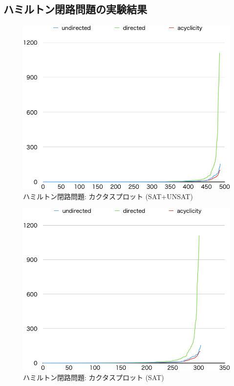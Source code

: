 \subsection{ハミルトン閉路問題の実験結果}


\begin{figure}[tb]
\begin{center}
  \includegraphics[width=0.6\linewidth]{fig/cactus.png}
\caption{ハミルトン閉路問題: カクタスプロット (\textsf{SAT+UNSAT})}
\label{cactus}
\end{center}
\end{figure}

\begin{figure}[tb]
\begin{center}
  \includegraphics[width=0.6\linewidth]{fig/cactussat.png}
\caption{ハミルトン閉路問題: カクタスプロット (\textsf{SAT})}
\label{cactussat}
\end{center}
\end{figure}

